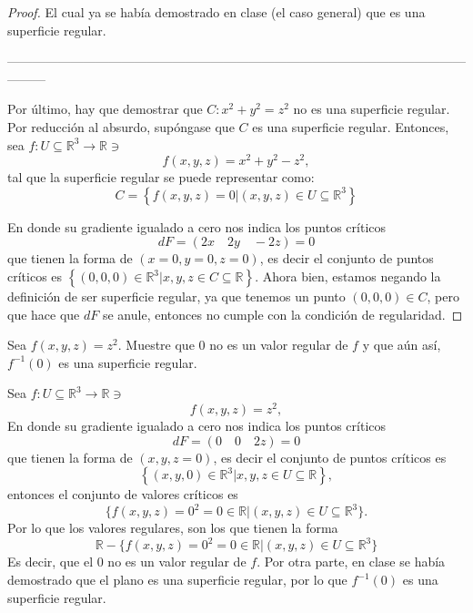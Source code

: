 \begin{problema}
\begin{proof}
        El cual ya se había demostrado en clase (el caso general) que es una superficie regular. 

        ---------------------------------------------------------------------------------------------------------------------

        Por último, hay que demostrar que $C: x^2+y^2=z^2$ no es una superficie regular. Por reducción al absurdo, supóngase que $C$ es una superficie regular. Entonces, sea $f: U\subseteq \mathbb{R}^3\to \mathbb{R}\ni$
        $$f(x,y,z)= x^2+y^2-z^2,$$
        tal que la superficie regular se puede representar como:
        $$C=\left\{f(x,y,z)=0| (x,y,z)\in U\subseteq \mathbb{R}^3\right\}$$

        En donde su gradiente igualado a cero nos indica los puntos críticos
        $$dF =\left( 2x\quad 2y \quad -2z\right)=0$$
        que tienen la forma de $(x=0,y=0,z=0)$, es decir el conjunto de puntos críticos es $\left\{(0,0,0)\in \mathbb{R}^3| x,y,z\in C\subseteq\mathbb{R}\right\}$. Ahora bien, estamos negando la definición de ser superficie regular, ya que tenemos un punto $(0,0,0)\in C$, pero que hace que $dF$ se anule, entonces no cumple con la condición de regularidad. 
    \end{proof}
\end{problema}

\begin{problema}
    Sea $f(x, y, z)=z^2$. Muestre que 0 no es un valor regular de $f$ y que aún así, $f^{-1}(0)$ es una superficie regular.
    \begin{dem}
        Sea $f: U\subseteq \mathbb{R}^3\to \mathbb{R}\ni$
        $$f(x,y,z)= z^2,$$
        En donde su gradiente igualado a cero nos indica los puntos críticos
        $$dF =\left(0\quad 0 \quad 2z\right)=0$$
        que tienen la forma de $(x,y,z=0)$, es decir el conjunto de puntos críticos es 
        $$\left\{(x,y,0)\in \mathbb{R}^3| x,y,z\in U\subseteq\mathbb{R}\right\},$$ entonces el conjunto de valores críticos es $$\{f(x,y,z)=0^2=0\in \mathbb{R}|(x,y,z)\in U\subseteq\mathbb{R}^3\}.$$
        Por lo que los valores regulares, son los que tienen la forma $$\mathbb{R}-\{f(x,y,z)=0^2=0\in \mathbb{R}|(x,y,z)\in U\subseteq\mathbb{R}^3\}$$
        Es decir, que el $0$ no es un valor regular de $f$. Por otra parte, en clase se había demostrado que el plano es una superficie regular, por lo que $f^{-1}(0)$ es una superficie regular.  
    \end{dem}

\end{problema}


